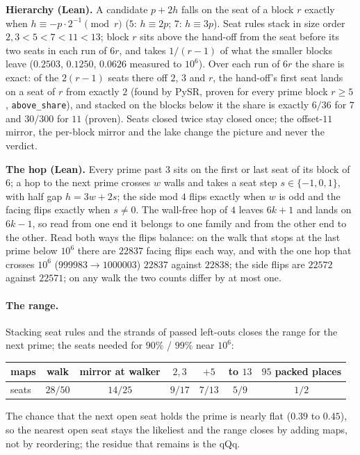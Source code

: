 \documentclass[11pt]{article}
\begin{document}
\textbf{Hierarchy (Lean).} A candidate $p+2h$ falls on the seat of a block $r$ exactly when $h \equiv -p\cdot2^{-1} \pmod r$ ($5$: $h\equiv2p$; $7$: $h\equiv3p$). Seat rules stack in size order $2,3 < 5 < 7 < 11 < 13$; block $r$ sits above the hand-off from the seat before its two seats in each run of $6r$, and takes $1/(r-1)$ of what the smaller blocks leave ($0.2503$, $0.1250$, $0.0626$ measured to $10^6$). Over each run of $6r$ the share is exact: of the $2(r-1)$ seats there off $2$, $3$ and $r$, the hand-off's first seat lands on a seat of $r$ from exactly $2$ (found by PySR, proven for every prime block $r\ge5$, \texttt{above\_share}), and stacked on the blocks below it the share is exactly $6/36$ for $7$ and $30/300$ for $11$ (proven). Seats closed twice stay closed once; the offset-$11$ mirror, the per-block mirror and the lake change the picture and never the verdict.

\textbf{The hop (Lean).} Every prime past $3$ sits on the first or last seat of its block of $6$; a hop to the next prime crosses $w$ walls and takes a seat step $s\in\{-1,0,1\}$, with half gap $h = 3w+2s$; the side mod $4$ flips exactly when $w$ is odd and the facing flips exactly when $s\neq0$. The wall-free hop of $4$ leaves $6k+1$ and lands on $6k-1$, so read from one end it belongs to one family and from the other end to the other. Read both ways the flips balance: on the walk that stops at the last prime below $10^6$ there are $22837$ facing flips each way, and with the one hop that crosses $10^6$ ($999983\to1000003$) $22837$ against $22838$; the side flips are $22572$ against $22571$; on any walk the two counts differ by at most one.

\paragraph{The range.} Stacking seat rules and the strands of passed left-outs closes the range for the next prime; the seats needed for $90\%$ / $99\%$ near $10^6$:
\begin{center}\begin{tabular}{lcccccc}\toprule
maps & walk & mirror at walker & $2,3$ & $+5$ & to $13$ & $95$ packed places\\\midrule
seats & $28/50$ & $14/25$ & $9/17$ & $7/13$ & $5/9$ & $1/2$\\\bottomrule
\end{tabular}\end{center}
The chance that the next open seat holds the prime is nearly flat ($0.39$ to $0.45$), so the nearest open seat stays the likeliest and the range closes by adding maps, not by reordering; the residue that remains is the qQq.
\end{document}
